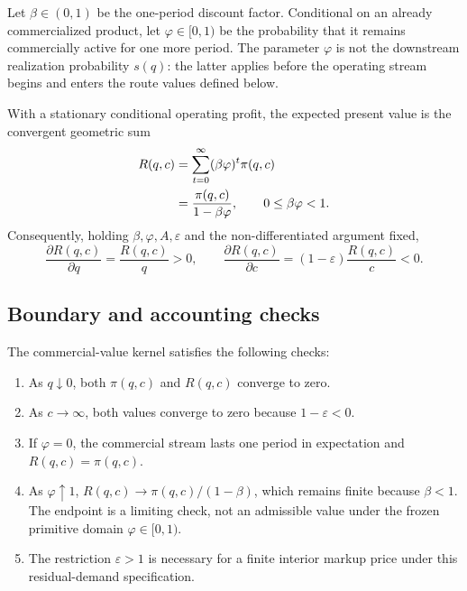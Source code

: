 Let \(\beta\in(0,1)\) be the one-period discount factor. Conditional on an
already commercialized product, let \(\varphi\in[0,1)\) be the probability
that it remains commercially active for one more period. The parameter
\(\varphi\) is not the downstream realization probability \(s(q)\): the
latter applies before the operating stream begins and enters the route values
defined below.

With a stationary conditional operating profit, the expected present value is
the convergent geometric sum
\begin{align}
  R(q,c)
  &=\sum_{t=0}^{\infty}(\beta\varphi)^t\pi(q,c) \notag\\
  &=\frac{\pi(q,c)}{1-\beta\varphi},
  \qquad 0\leq\beta\varphi<1.
  \label{eq:p02-present-value}
\end{align}
Consequently, holding \(\beta,\varphi,A,\varepsilon\) and the
non-differentiated argument fixed,
\begin{equation}
  \frac{\partial R(q,c)}{\partial q}
  =\frac{R(q,c)}{q}>0,
  \qquad
  \frac{\partial R(q,c)}{\partial c}
  =(1-\varepsilon)\frac{R(q,c)}{c}<0.
  \label{eq:p02-return-derivatives}
\end{equation}

\subsection{Boundary and accounting checks}
\label{subsec:p02-boundary-accounting}

The commercial-value kernel satisfies the following checks:
\begin{enumerate}
  \item As \(q\downarrow0\), both \(\pi(q,c)\) and \(R(q,c)\) converge to
  zero.
  \item As \(c\to\infty\), both values converge to zero because
  \(1-\varepsilon<0\).
  \item If \(\varphi=0\), the commercial stream lasts one period in
  expectation and \(R(q,c)=\pi(q,c)\).
  \item As \(\varphi\uparrow1\),
  \(R(q,c)\to\pi(q,c)/(1-\beta)\), which remains finite because
  \(\beta<1\). The endpoint is a limiting check, not an admissible value
  under the frozen primitive domain \(\varphi\in[0,1)\).
  \item The restriction \(\varepsilon>1\) is necessary for a finite interior
  markup price under this residual-demand specification.
\end{enumerate}

